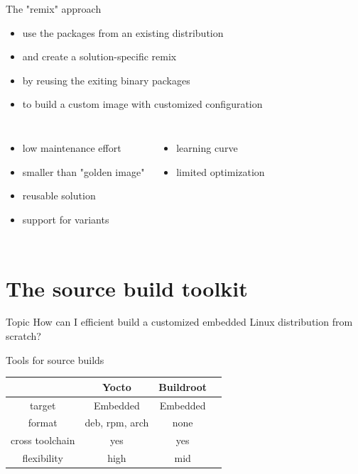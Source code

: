 \documentclass{beamer}
\newcommand\pro{\item[$+$]}
\newcommand\con{\item[$-$]}
\begin{document}
\begin{frame}{The "remix" approach}
	\begin{itemize}
		\item use the packages from an existing distribution
		\item and create a solution-specific remix
		\item by reusing the exiting binary packages
		\item to build a custom image with customized configuration
	\end{itemize}

	\begin{columns}[t]
		\centering
		\begin{itemize}
			\pro low maintenance effort
			\pro smaller than "golden image"
			\pro reusable solution
			\pro support for variants
		\end{itemize}
		\centering
		\begin{itemize}
			\con learning curve
			\con limited optimization
		\end{itemize}
	\end{columns}
\end{frame}

\section{The source build toolkit}

\begin{frame}
	\begin{block}{Topic}
		How can I efficient build a customized embedded Linux distribution from scratch?
	\end{block}
\end{frame}

\begin{frame}{Tools for source builds}
	\begin{tabular}{c|ccc}
		& \textbf{Yocto} & \textbf{Buildroot}  \\
		\hline
		target & Embedded  & Embedded \\ 
		format & deb, rpm, arch & none \\
		cross toolchain & yes & yes \\
		flexibility & high & mid \\
	\end{tabular}
\end{frame}
\end{document}
